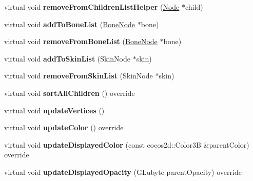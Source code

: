 \begin{DoxyCompactItemize}
\item 
\mbox{\label{classBoneNode_a134d040644bcdb4a98314cfdb22d3a42}} 
virtual void {\bfseries remove\+From\+Children\+List\+Helper} (\hyperlink{classNode}{Node} $\ast$child)
\item 
\mbox{\label{classBoneNode_acaaeb2a189d3d961447e9b45f75f1e5f}} 
virtual void {\bfseries add\+To\+Bone\+List} (\hyperlink{classBoneNode}{Bone\+Node} $\ast$bone)
\item 
\mbox{\label{classBoneNode_aa563f4d7fe6013473f934874331f7ef0}} 
virtual void {\bfseries remove\+From\+Bone\+List} (\hyperlink{classBoneNode}{Bone\+Node} $\ast$bone)
\item 
\mbox{\label{classBoneNode_a93159e3ca42b34d35aa69d790cd25e85}} 
virtual void {\bfseries add\+To\+Skin\+List} (Skin\+Node $\ast$skin)
\item 
\mbox{\label{classBoneNode_a53704d9e7fdfcf14302143010b9caa21}} 
virtual void {\bfseries remove\+From\+Skin\+List} (Skin\+Node $\ast$skin)
\item 
\mbox{\label{classBoneNode_a4ba22d8a6101bf0cd3e7a76ac2f1d31e}} 
virtual void {\bfseries sort\+All\+Children} () override
\item 
\mbox{\label{classBoneNode_a50aa995128fedbd5bf97f3f1a0dab24e}} 
virtual void {\bfseries update\+Vertices} ()
\item 
\mbox{\label{classBoneNode_a245a7bb8aeca7952d7f398b91c1a7465}} 
virtual void {\bfseries update\+Color} () override
\item 
\mbox{\label{classBoneNode_ab867330d767b96db98344f3241475f36}} 
virtual void {\bfseries update\+Displayed\+Color} (const cocos2d\+::\+Color3B \&parent\+Color) override
\item 
\mbox{\label{classBoneNode_a0e0fbc956636564ca7988fce505def1f}} 
virtual void {\bfseries update\+Displayed\+Opacity} (G\+Lubyte parent\+Opacity) override
\item 
\mbox{\label{classBoneNode_a001bc686051fe69413abee8f006abd00}} 

\end{DoxyCompactItemize}

